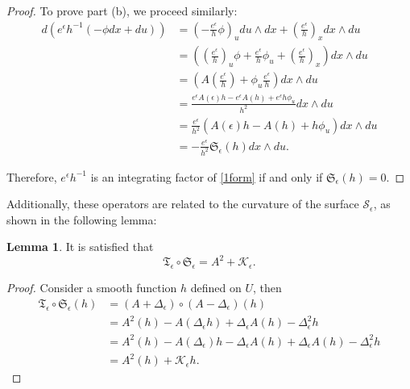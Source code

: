 \documentclass{article}
\theoremstyle{remark}
\theoremstyle{definition}
\newtheorem{lemma}[remark]{Lemma}
\begin{document}
\begin{proof}
To prove part (b), we proceed similarly:
\begin{equation}
    \begin{aligned}
        d\left(e^{\epsilon}h^{-1} (-\phi dx+du)\right)
        &= \left(- \frac{e^{\epsilon}}{h} \phi\right)_u du\wedge dx+\left(\frac{e^{\epsilon}}{h}\right)_x dx\wedge du \\
        &= \left(\left(\frac{e^{\epsilon}}{h}\right)_u \phi+\frac{e^{\epsilon}}{h}\phi_u+\left(\frac{e^{\epsilon}}{h}\right)_x\right) dx\wedge du \\
        &= \left(A\left(\frac{e^{\epsilon}}{h}\right) + \phi_u \frac{e^{\epsilon}}{h}\right) dx \wedge du \\
        &= \frac{e^{\epsilon}A(\epsilon)h-e^{\epsilon}A(h)+e^{\epsilon}h\phi_u}{ h^2}dx \wedge du \\
        &= \frac{e^{\epsilon}}{h^2}\left(A(\epsilon)h-A(h)+h\phi_u\right)dx \wedge du \\
        &= -\frac{e^{\epsilon}}{h^2} \mathfrak{S}_{\epsilon}(h)dx \wedge du.
    \end{aligned}
\end{equation}

Therefore, $e^{\epsilon} h^{-1}$ is an integrating factor of \eqref{1form} if and only if $\mathfrak{S}_{\epsilon}(h)=0$.
\end{proof}

Additionally, these operators are related to the curvature of the surface $\mathcal{S}_{\epsilon}$, as shown in the following lemma:
\begin{lemma}\label{lem:op}
    It is satisfied that
    \begin{equation}
        \mathfrak{T}_{\epsilon}\circ \mathfrak{S}_{\epsilon}=A^2+\mathcal{K}_{\epsilon}.
    \end{equation}
\end{lemma}
\begin{proof}
    Consider a smooth function $h$ defined on $U$, then
    \begin{align*}
        \mathfrak{T}_{\epsilon}\circ \mathfrak{S}_{\epsilon} (h)&= (A+\Delta_{\epsilon})\circ (A-\Delta_{\epsilon})(h) \\
        &= A^2(h)-A(\Delta_{\epsilon} h)+\Delta_{\epsilon} A(h) - \Delta_{\epsilon}^2 h\\
        &= A^2(h)-A(\Delta_{\epsilon})h-\Delta_{\epsilon}A(h)+\Delta_{\epsilon} A(h) - \Delta_{\epsilon}^2 h\\
        &= A^2(h) + \mathcal{K}_{\epsilon}h.
    \end{align*}
\end{proof}
\end{document}
